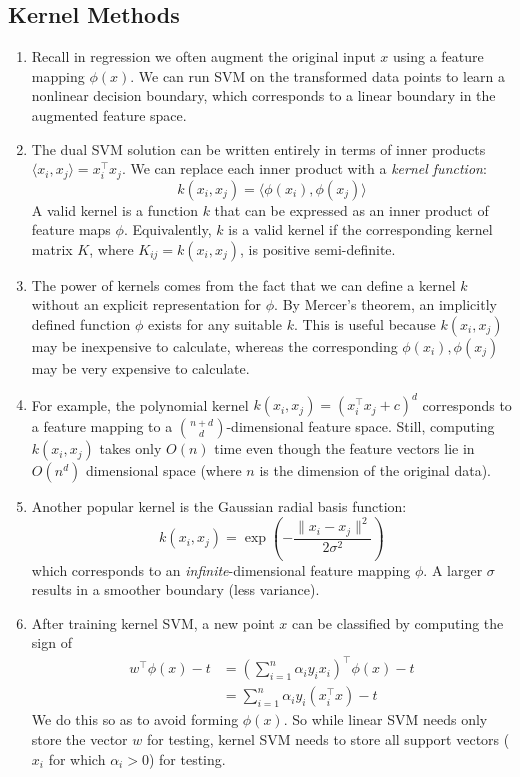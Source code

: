 \documentclass[10pt]{article}
\begin{document}
\begin{multicols}{2}
\begin{addmargin}[0.8em]{0.5em}
    \subsection{Kernel Methods}
    \begin{enumerate}[label=(\alph*)]
        \item Recall in regression we often augment the original input $x$ using a feature mapping $\phi(x)$. We can run SVM on the transformed data points to learn a nonlinear decision boundary, which corresponds to a linear boundary in the augmented feature space.
        
        \item The dual SVM solution can be written entirely in terms of inner products $\langle x_i, x_j \rangle = x_i^\top x_j$. We can replace each inner product with a \textit{kernel function}:
        $$
        k(x_i, x_j) = \langle \phi(x_i), \phi(x_j) \rangle
        $$
        A valid kernel is a function $k$ that can be expressed as an inner product of feature maps $\phi$. Equivalently, $k$ is a valid kernel if the corresponding kernel matrix $K$, where $K_{ij} = k(x_i, x_j)$, is positive semi-definite.
        
        \item The power of kernels comes from the fact that we can define a kernel $k$ without an explicit representation for $\phi$. By Mercer's theorem, an implicitly defined function $\phi$ exists for any suitable $k$. This is useful because $k(x_i, x_j)$ may be inexpensive to calculate, whereas the corresponding $\phi(x_i), \phi(x_j)$ may be very expensive to calculate.
        
        \item For example, the polynomial kernel $k(x_i, x_j) = (x_i^\top x_j + c)^d$ corresponds to a feature mapping to a $\binom{n+d}{d}$-dimensional feature space. Still, computing $k(x_i, x_j)$ takes only $O(n)$ time even though the feature vectors lie in $O(n^d)$ dimensional space (where $n$ is the dimension of the original data).
        
        \item Another popular kernel is the Gaussian radial basis function:
        $$
        k(x_i, x_j) = \exp \left( -\frac{\| x_i - x_j \|^2}{2\sigma^2} \right)
        $$
        which corresponds to an \textit{infinite}-dimensional feature mapping $\phi$. A larger $\sigma$ results in a smoother boundary (less variance).
        
        \item After training kernel SVM, a new point $x$ can be classified by computing the sign of
        \begin{align*}
            w^\top \phi(x) - t &= \left( \sum_{i=1}^{n} \alpha_i y_i x_i \right)^\top \phi(x) - t \\
            &= \sum_{i=1}^{n} \alpha_i y_i (x_i^\top x) - t
        \end{align*}
        We do this so as to avoid forming $\phi(x)$. So while linear SVM needs only store the vector $w$ for testing, kernel SVM needs to store all support vectors ($x_i$ for which $\alpha_i > 0$) for testing.
        

\end{enumerate}
\end{addmargin}
\end{multicols}
\end{document}
